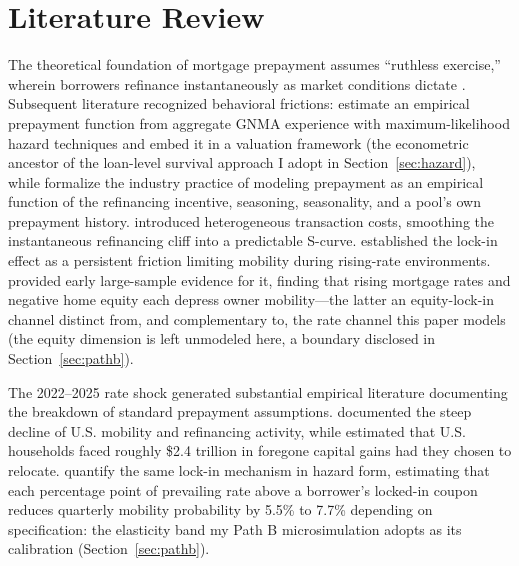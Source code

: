 \documentclass[12pt]{article}
\begin{document}
\section{Literature Review}\label{sec:lit}

The theoretical foundation of mortgage prepayment assumes ``ruthless exercise,'' wherein borrowers refinance instantaneously as market conditions dictate \citep{dunn1981}. Subsequent literature recognized behavioral frictions: \citet{schwartz1989} estimate an empirical prepayment function from aggregate GNMA experience with maximum-likelihood hazard techniques and embed it in a valuation framework (the econometric ancestor of the loan-level survival approach I adopt in Section~\ref{sec:hazard}), while \citet{richard1989} formalize the industry practice of modeling prepayment as an empirical function of the refinancing incentive, seasoning, seasonality, and a pool's own prepayment history. \citet{stanton1995} introduced heterogeneous transaction costs, smoothing the instantaneous refinancing cliff into a predictable S-curve. \citet{quigley1987,quigley2002} established the lock-in effect as a persistent friction limiting mobility during rising-rate environments. \citet{ferreira2010} provided early large-sample evidence for it, finding that rising mortgage rates and negative home equity each depress owner mobility---the latter an equity-lock-in channel distinct from, and complementary to, the rate channel this paper models (the equity dimension is left unmodeled here, a boundary disclosed in Section~\ref{sec:pathb}).

The 2022--2025 rate shock generated substantial empirical literature documenting the breakdown of standard prepayment assumptions. \citet{fonseca2024} documented the steep decline of U.S. mobility and refinancing activity, while \citet{batzer2024} estimated that U.S. households faced roughly \$2.4 trillion in foregone capital gains had they chosen to relocate. \citet{liebersohn2024} quantify the same lock-in mechanism in hazard form, estimating that each percentage point of prevailing rate above a borrower's locked-in coupon reduces quarterly mobility probability by 5.5\% to 7.7\% depending on specification: the elasticity band my Path B microsimulation adopts as its calibration (Section~\ref{sec:pathb}).
\end{document}
